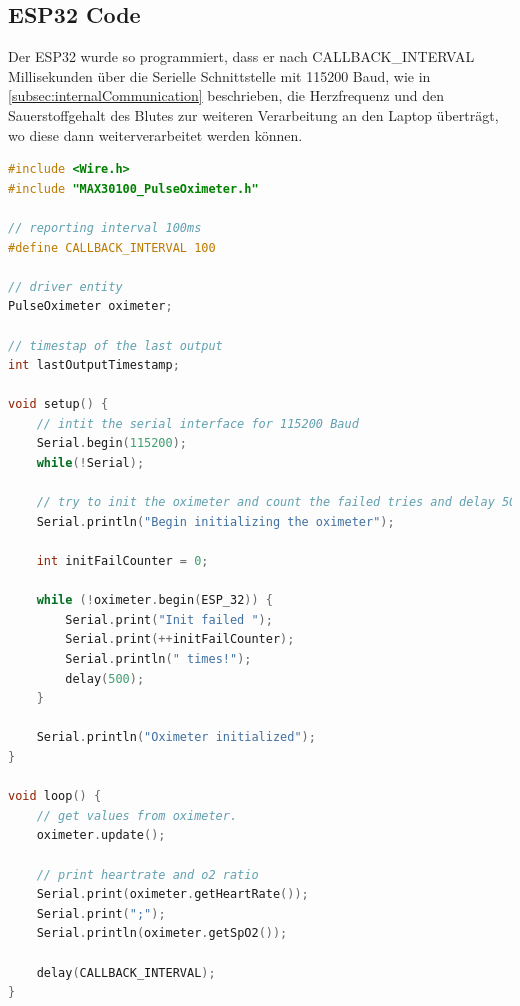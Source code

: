\documentclass[12pt,oneside]{article}
\begin{document}
  \subsection{ESP32 Code}
  Der ESP32 wurde so programmiert, dass er nach CALLBACK\_INTERVAL Millisekunden über die Serielle Schnittstelle mit 115200 Baud, wie in \ref{subsec:internalCommunication} beschrieben, die Herzfrequenz und den Sauerstoffgehalt des Blutes zur weiteren Verarbeitung an den Laptop überträgt, wo diese dann weiterverarbeitet werden können.
  
  \begin{lstlisting}[language=C, caption={Quellcode des ESP32-Programms}, captionpos=b, label=srcEsp]
#include <Wire.h>
#include "MAX30100_PulseOximeter.h"

// reporting interval 100ms
#define CALLBACK_INTERVAL 100

// driver entity
PulseOximeter oximeter;

// timestap of the last output
int lastOutputTimestamp;

void setup() {
	// intit the serial interface for 115200 Baud
	Serial.begin(115200);
	while(!Serial);
	
	// try to init the oximeter and count the failed tries and delay 500ms.
	Serial.println("Begin initializing the oximeter");
	
	int initFailCounter = 0;
	
	while (!oximeter.begin(ESP_32)) {
		Serial.print("Init failed ");
		Serial.print(++initFailCounter);
		Serial.println(" times!");
		delay(500);
	}
	
	Serial.println("Oximeter initialized");
}

void loop() {
	// get values from oximeter.
	oximeter.update();
	
	// print heartrate and o2 ratio
	Serial.print(oximeter.getHeartRate());
	Serial.print(";");
	Serial.println(oximeter.getSpO2());
	
	delay(CALLBACK_INTERVAL);
}
  \end{lstlisting}
\end{document}
